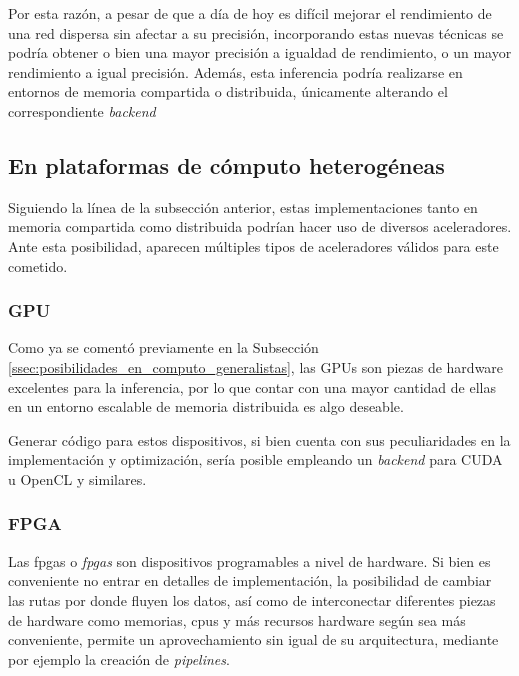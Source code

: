 Por esta razón, a pesar de que a día de hoy es difícil mejorar el rendimiento de una red dispersa sin afectar a su precisión, incorporando estas nuevas técnicas se podría obtener o bien una mayor precisión a igualdad de rendimiento, o un mayor rendimiento a igual precisión. Además, esta inferencia podría realizarse en entornos de memoria compartida o distribuida, únicamente alterando el correspondiente \textit{\gls{backend}} 






\subsection{En plataformas de cómputo heterogéneas}
\label{ssec:posibilidades_en_computo_heterogeneas}
Siguiendo la línea de la subsección anterior, estas implementaciones tanto en memoria compartida como distribuida podrían hacer uso de diversos aceleradores. Ante esta posibilidad, aparecen múltiples tipos de aceleradores válidos para este cometido.

\subsubsection{GPU}
\label{sssec:heterogeneas_gpu}
Como ya se comentó previamente en la Subsección \ref{ssec:posibilidades_en_computo_generalistas}, las GPUs son piezas de hardware excelentes para la inferencia, por lo que contar con una mayor cantidad de ellas en un entorno escalable de memoria distribuida es algo deseable.

Generar código para estos dispositivos, si bien cuenta con sus peculiaridades en la implementación y optimización, sería posible empleando un \textit{\gls{backend}} para CUDA u OpenCL y similares.

\subsubsection{FPGA}
\label{sssec:heterogeneas_fpga}
Las \acrshort{fpga}s o \textit{\acrlong{fpga}s} son dispositivos programables a nivel de hardware. Si bien es conveniente no entrar en detalles de implementación, la posibilidad de cambiar las rutas por donde fluyen los datos, así como de interconectar diferentes piezas de hardware como memorias, \acrshort{cpu}s y más recursos hardware según sea más conveniente, permite un aprovechamiento sin igual de su arquitectura, mediante por ejemplo la creación de \textit{pipelines}.

